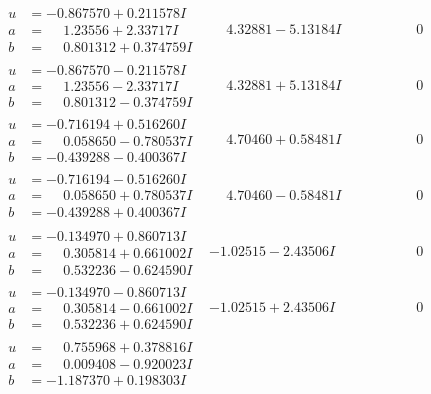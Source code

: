 \documentclass[1p]{elsarticle_modified}
\theoremstyle{definition}
\begin{document}
$$\begin{array}{c|c|c}
\begin{aligned}
u &= -0.867570 + 0.211578 I \\
a &= \phantom{-}1.23556 + 2.33717 I \\
b &= \phantom{-}0.801312 + 0.374759 I\end{aligned}
 & \phantom{-}4.32881 - 5.13184 I & \phantom{-0.000000 } 0 \\ \hline\begin{aligned}
u &= -0.867570 - 0.211578 I \\
a &= \phantom{-}1.23556 - 2.33717 I \\
b &= \phantom{-}0.801312 - 0.374759 I\end{aligned}
 & \phantom{-}4.32881 + 5.13184 I & \phantom{-0.000000 } 0 \\ \hline\begin{aligned}
u &= -0.716194 + 0.516260 I \\
a &= \phantom{-}0.058650 - 0.780537 I \\
b &= -0.439288 - 0.400367 I\end{aligned}
 & \phantom{-}4.70460 + 0.58481 I & \phantom{-0.000000 } 0 \\ \hline\begin{aligned}
u &= -0.716194 - 0.516260 I \\
a &= \phantom{-}0.058650 + 0.780537 I \\
b &= -0.439288 + 0.400367 I\end{aligned}
 & \phantom{-}4.70460 - 0.58481 I & \phantom{-0.000000 } 0 \\ \hline\begin{aligned}
u &= -0.134970 + 0.860713 I \\
a &= \phantom{-}0.305814 + 0.661002 I \\
b &= \phantom{-}0.532236 - 0.624590 I\end{aligned}
 & -1.02515 - 2.43506 I & \phantom{-0.000000 } 0 \\ \hline\begin{aligned}
u &= -0.134970 - 0.860713 I \\
a &= \phantom{-}0.305814 - 0.661002 I \\
b &= \phantom{-}0.532236 + 0.624590 I\end{aligned}
 & -1.02515 + 2.43506 I & \phantom{-0.000000 } 0 \\ \hline\begin{aligned}
u &= \phantom{-}0.755968 + 0.378816 I \\
a &= \phantom{-}0.009408 - 0.920023 I \\
b &= -1.187370 + 0.198303 I\end{aligned}

\end{array}$$
\end{document}
